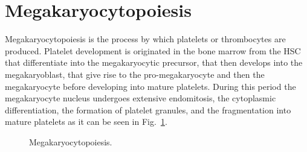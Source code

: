 \documentclass[final,a4paper,12pt,english]{UnicaPhdThesis3}
\begin{document}
	\section{Megakaryocytopoiesis}
	Megakaryocytopoiesis is the process by which platelets or thrombocytes are produced. Platelet development is originated in the bone marrow from the HSC that differentiate into the megakaryocytic precursor, that then develops into the megakaryoblast, that give rise to the pro-megakaryocyte and then the megakaryocyte before developing into mature platelets. During this period the megakaryocyte nucleus undergoes extensive endomitosis, the cytoplasmic differentiation, the formation of platelet granules, and the fragmentation into mature platelets as it can be seen in Fig.~\ref{fig:Megakaryocytopoiesis}.
	
	\begin{figure}[!htbp]
		\centering
		\caption{\label{fig:Megakaryocytopoiesis} Megakaryocytopoiesis.}
	\end{figure}
	
\end{document}
